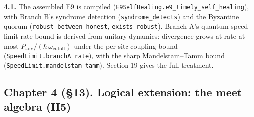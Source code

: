 \documentclass[
]{article}
\begin{document}
\textbf{4.1.} The assembled E9 is compiled
(\texttt{E\allowbreak{}9\allowbreak{}S\allowbreak{}e\allowbreak{}l\allowbreak{}f\allowbreak{}H\allowbreak{}e\allowbreak{}a\allowbreak{}l\allowbreak{}i\allowbreak{}n\allowbreak{}g\allowbreak{}.\allowbreak{}e\allowbreak{}9\allowbreak{}\_\allowbreak{}t\allowbreak{}i\allowbreak{}m\allowbreak{}e\allowbreak{}l\allowbreak{}y\allowbreak{}\_\allowbreak{}s\allowbreak{}e\allowbreak{}l\allowbreak{}f\allowbreak{}\_\allowbreak{}h\allowbreak{}e\allowbreak{}a\allowbreak{}l\allowbreak{}i\allowbreak{}n\allowbreak{}g}),
with Branch B's syndrome detection (\texttt{syndrome\_detects}) and the
Byzantine quorum
(\texttt{r\allowbreak{}o\allowbreak{}b\allowbreak{}u\allowbreak{}s\allowbreak{}t\allowbreak{}\_\allowbreak{}b\allowbreak{}e\allowbreak{}t\allowbreak{}w\allowbreak{}e\allowbreak{}e\allowbreak{}n\allowbreak{}\_\allowbreak{}h\allowbreak{}o\allowbreak{}n\allowbreak{}e\allowbreak{}s\allowbreak{}t},
\texttt{exists\_robust}). Branch A's quantum-speed-limit rate bound is
derived from unitary dynamics: divergence grows at rate at most
\(P_{\mathrm{adv}}/(\hbar\,\omega_{\mathrm{cutoff}})\) under the
per-site coupling bound
(\texttt{S\allowbreak{}p\allowbreak{}e\allowbreak{}e\allowbreak{}d\allowbreak{}L\allowbreak{}i\allowbreak{}m\allowbreak{}i\allowbreak{}t\allowbreak{}.\allowbreak{}b\allowbreak{}r\allowbreak{}a\allowbreak{}n\allowbreak{}c\allowbreak{}h\allowbreak{}A\allowbreak{}\_\allowbreak{}r\allowbreak{}a\allowbreak{}t\allowbreak{}e}),
with the sharp Mandelstam--Tamm bound
(\texttt{S\allowbreak{}p\allowbreak{}e\allowbreak{}e\allowbreak{}d\allowbreak{}L\allowbreak{}i\allowbreak{}m\allowbreak{}i\allowbreak{}t\allowbreak{}.\allowbreak{}m\allowbreak{}a\allowbreak{}n\allowbreak{}d\allowbreak{}e\allowbreak{}l\allowbreak{}s\allowbreak{}t\allowbreak{}a\allowbreak{}m\allowbreak{}\_\allowbreak{}t\allowbreak{}a\allowbreak{}m\allowbreak{}m}).
Section 19 gives the full treatment.

\subsection{Chapter 4 (§13). Logical extension: the meet algebra
(H5)}\label{chapter-4-13.-logical-extension-the-meet-algebra-h5}
\end{document}
